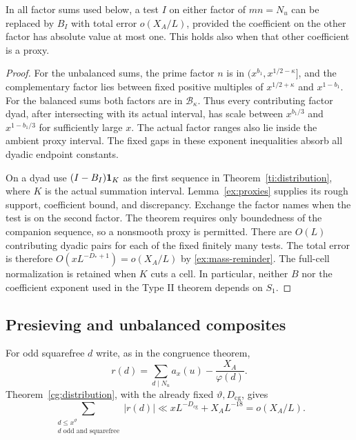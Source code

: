 \begin{lemma}
\label{ex:replacement}
In all factor sums used below, a test $I$ on either factor of
$mn=N_u$ can be replaced by $B_I$ with total error $o(X_A/L)$,
provided the coefficient on the other factor has absolute value at
most one. This holds also when that other coefficient is a proxy.
\end{lemma}

\begin{proof}
For the unbalanced sums, the prime factor $n$ is in
$(x^{b_1},x^{1/2-\kappa}]$, and the complementary factor lies
between fixed positive multiples of $x^{1/2+\kappa}$ and
$x^{1-b_1}$. For the balanced sums both factors are in
$\mathcal B_\kappa$. Thus every contributing factor dyad, after
intersecting with its actual interval, has scale between
$x^{b_1/3}$ and $x^{1-b_1/3}$ for sufficiently large $x$.
The actual factor ranges also lie inside the ambient proxy
interval. The fixed gaps in these exponent inequalities absorb
all dyadic endpoint constants.

On a dyad use $(I-B_I)\mathbf{1}_K$ as the first sequence in
Theorem~\ref{ti:distribution}, where $K$ is the actual summation
interval. Lemma~\ref{ex:proxies} supplies its rough support,
coefficient bound, and discrepancy. Exchange the factor names
when the test is on the second factor. The theorem requires only
boundedness of the companion sequence, so a nonsmooth proxy is
permitted. There are $O(L)$ contributing dyadic pairs for each
of the fixed finitely many tests. The total error is therefore
$O(xL^{-D_*+1})=o(X_A/L)$ by \eqref{ex:mass-reminder}.
The full-cell normalization is retained when $K$ cuts a cell.
In particular, neither $B$ nor the coefficient exponent used in
the Type II theorem depends on $S_1$.
\end{proof}

\subsection{Presieving and unbalanced composites}

For odd squarefree $d$ write, as in the congruence theorem,
\[
 r(d)=\sum_{d\mid N_u}a_x(u)-\frac{X_A}{\varphi(d)}.
\]
Theorem~\ref{cg:distribution}, with the already fixed
$\vartheta,D_{\mathrm{cg}}$, gives
\begin{equation}\label{ex:remainder-sum}
 \sum_{\substack{d\le x^\vartheta\\d\text{ odd and squarefree}}}
       |r(d)|
 \ll xL^{-D_{\mathrm{cg}}}+X_AL^{-18}=o(X_A/L).
\end{equation}

